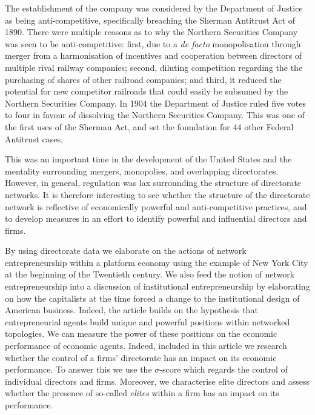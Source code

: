 \documentclass[11pt,fleqn]{article}
\begin{document}
The establishment of the company was considered by the Department of Justice as being anti-competitive, specifically breaching the Sherman Antitrust Act of 1890. There were multiple reasons as to why the Northern Securities Company was seen to be anti-competitive: first, due to a \emph{de facto} monopolisation through merger from a harmonisation of incentives and cooperation between directors of multiple rival railway companies; second, diluting competition regarding the the purchasing of shares of other railroad companies; and third, it reduced the potential for new competitor railroads that could easily be subsumed by the Northern Securities Company. In 1904 the Department of Justice ruled five votes to four in favour of dissolving the Northern Securities Company. This was one of the first uses of the Sherman Act, and set the foundation for 44 other Federal Antitrust cases.

This was an important time in the development of the United States and the mentality surrounding mergers, monopolies, and overlapping directorates. However, in general, regulation was lax surrounding the structure of directorate networks. It is therefore interesting to see whether the structure of the directorate network is reflective of economically powerful and anti-competitive practices, and to develop measures in an effort to identify powerful and influential directors and firms.

\medskip\noindent By using directorate data we elaborate on the actions of network entrepreneurship within a platform economy using the example of New York City at the beginning of the Twentieth century. We also feed the notion of network entrepreneurship into a discussion of institutional entrepreneurship by elaborating on how the capitalists at the time forced a change to the institutional design of American business. Indeed, the article builds on the hypothesis that entrepreneurial agents build unique and powerful positions within networked topologies. We can measure the power of these positions on the economic performance of economic agents. Indeed, included in this article we research whether the control of a firms' directorate has an impact on its economic performance. To answer this we use the $\sigma$-score which regards the control of individual directors and firms. Moreover, we characterise elite directors and assess whether the presence of so-called \emph{elites} within a firm has an impact on its performance.
\end{document}
